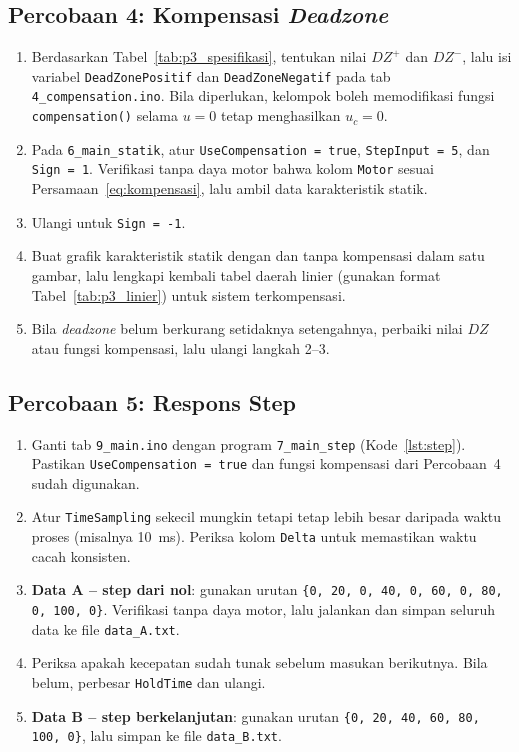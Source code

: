 \documentclass[11pt,a4paper]{article}
\newcommand{\prog}[1]{\texttt{#1}}
\begin{document}
\subsection{Percobaan 4: Kompensasi \textit{Deadzone}}
\begin{enumerate}
	\item Berdasarkan Tabel~\ref{tab:p3_spesifikasi}, tentukan nilai $DZ^{+}$ dan $DZ^{-}$, lalu isi variabel \texttt{DeadZonePositif} dan \texttt{DeadZoneNegatif} pada tab \prog{4\_compensation.ino}. Bila diperlukan, kelompok boleh memodifikasi fungsi \texttt{compensation()} selama $u = 0$ tetap menghasilkan $u_c = 0$.
	\item Pada \prog{6\_main\_statik}, atur \texttt{UseCompensation = true}, \texttt{StepInput = 5}, dan \texttt{Sign = 1}. Verifikasi tanpa daya motor bahwa kolom \texttt{Motor} sesuai Persamaan~\eqref{eq:kompensasi}, lalu ambil data karakteristik statik.
	\item Ulangi untuk \texttt{Sign = -1}.
	\item Buat grafik karakteristik statik dengan dan tanpa kompensasi dalam satu gambar, lalu lengkapi kembali tabel daerah linier (gunakan format Tabel~\ref{tab:p3_linier}) untuk sistem terkompensasi.
	\item Bila \textit{deadzone} belum berkurang setidaknya setengahnya, perbaiki nilai $DZ$ atau fungsi kompensasi, lalu ulangi langkah 2--3.
\end{enumerate}

\subsection{Percobaan 5: Respons Step}
\begin{enumerate}
	\item Ganti tab \prog{9\_main.ino} dengan program \prog{7\_main\_step} (Kode~\ref{lst:step}). Pastikan \texttt{UseCompensation = true} dan fungsi kompensasi dari Percobaan~4 sudah digunakan.
	\item Atur \texttt{TimeSampling} sekecil mungkin tetapi tetap lebih besar daripada waktu proses (misalnya 10~ms). Periksa kolom \texttt{Delta} untuk memastikan waktu cacah konsisten.
	\item \textbf{Data A -- step dari nol}: gunakan urutan \texttt{\{0, 20, 0, 40, 0, 60, 0, 80, 0, 100, 0\}}. Verifikasi tanpa daya motor, lalu jalankan dan simpan seluruh data ke file \prog{data\_A.txt}.
	\item Periksa apakah kecepatan sudah tunak sebelum masukan berikutnya. Bila belum, perbesar \texttt{HoldTime} dan ulangi.
	\item \textbf{Data B -- step berkelanjutan}: gunakan urutan \texttt{\{0, 20, 40, 60, 80, 100, 0\}}, lalu simpan ke file \prog{data\_B.txt}.
\end{enumerate}
\end{document}

